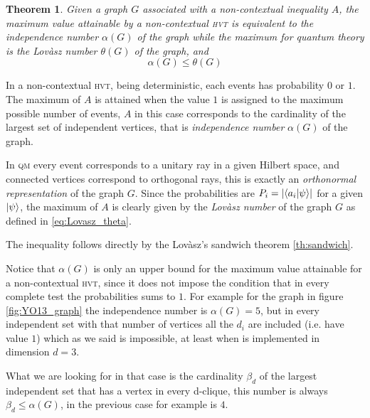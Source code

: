 \documentclass[a4paper]{article}
\newcommand{\abs}[1]{\lvert #1 \rvert}
\newcommand{\acron}[1]{\textsc{#1}}
\newcommand{\HVT}{\acron{hvt}}
\newcommand{\QM}{\acron{qm}}
\newtheorem{theorem}{Theorem}[section]
\theoremstyle{definition}
\let\oldproof\proof
\let\oldendproof\endproof
\renewenvironment{proof}
    {
        \begin{framed} 
        \oldproof
    }
    {
        \oldendproof 
        \end{framed}
    }
\begin{document}
\begin{theorem}
    Given a graph $G$ associated with a non-contextual inequality $A$, the maximum value
    attainable by a non-contextual \HVT{} is equivalent to the independence number
    $\alpha(G)$ of the graph while the maximum for quantum theory is the Lovàsz number
    $\theta(G)$ of the graph, and
    \begin{equation}
        \alpha(G) \le \theta(G)
    \end{equation}
    \label{th:nc_graph_indilov}
\end{theorem}
\begin{proof}
    In a non-contextual \HVT{}, being deterministic, each events has probability
    $0$ or $1$.
    The maximum of $A$ is attained when the value $1$ is assigned to the maximum
    possible number of events, $A$ in this case corresponds to the cardinality
    of the largest set of independent vertices, that is \emph{independence
    number} $\alpha(G)$ of the graph.

    In \QM{} every event corresponds to a unitary ray in a given Hilbert space,
    and connected vertices correspond to orthogonal rays, this is exactly an
    \emph{orthonormal representation} of the graph $G$.
    Since the probabilities are $P_i = \abs{\braket{a_i | \psi}}$ for a
    given $\Ket{\psi}$, the maximum of $A$ is clearly given by the
    \emph{Lovàsz number} of the graph $G$ as defined in
    \eqref{eq:Lovasz_theta}.

    The inequality follows directly by the Lovàsz's sandwich theorem
    \ref{th:sandwich}.
\end{proof}
Notice that $\alpha(G)$ is only an upper bound for the maximum value attainable
for a non-contextual \HVT{}, since it does not impose the condition that in every
complete test the probabilities sums to $1$.
For example for the graph in figure \ref{fig:YO13_graph} the independence number
is $\alpha(G) = 5$, but in every independent set with that number of vertices
all the $d_i$ are included (i.e. have value $1$) which as we
said is impossible, at least when is implemented in dimension $d=3$.

What we are looking for in that case is the cardinality $\beta_d$ of the largest
independent set that has a vertex in every d-clique, this number is always
$\beta_d \le \alpha(G)$, in the previous case for example is $4$.
\end{document}
